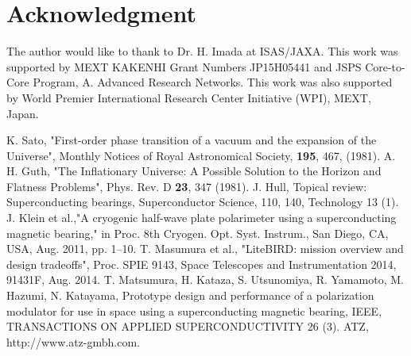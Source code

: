 \documentclass[a4paper]{jpconf}
\begin{document}
\section*{Acknowledgment}
The author would like to thank to Dr. H. Imada at ISAS/JAXA.
This work was supported by MEXT KAKENHI Grant Numbers JP15H05441 and JSPS Core-to-Core Program, A. Advanced Research Networks.
This work was also supported by World Premier International Research Center Initiative (WPI), MEXT, Japan.


\vspace*{5mm}
\begin{thebibliography}{99}

 K. Sato, "First-order phase transition of a vacuum and the expansion of the Universe", Monthly Notices of Royal Astronomical Society, {\bf 195}, 467, (1981).
A. H. Guth, "The Inflationary Universe: A Possible Solution to the Horizon and Flatness Problems", Phys. Rev. D {\bf 23}, 347 (1981).
J. Hull, Topical review: Superconducting bearings, Superconductor Science, 110, 140, Technology 13 (1).
J. Klein et al.,"A cryogenic half-wave plate polarimeter using a superconducting magnetic bearing," in Proc. 8th Cryogen. Opt. Syst. Instrum., San Diego, CA, USA, Aug. 2011, pp. 1–10.
T. Masumura et al., "LiteBIRD: mission overview and design tradeoffs", Proc. SPIE 9143, Space Telescopes and Instrumentation 2014, 91431F, Aug. 2014.
T. Matsumura, H. Kataza, S. Utsunomiya, R. Yamamoto, M. Hazumi, N. Katayama, Prototype design and performance of a polarization modulator for use in space using a superconducting magnetic bearing, IEEE, TRANSACTIONS ON APPLIED SUPERCONDUCTIVITY 26 (3).
ATZ, http://www.atz-gmbh.com.
\end{thebibliography}
\end{document}
